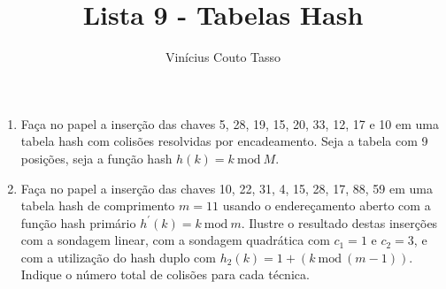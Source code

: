 \documentclass{article}
\title{Lista 9 - Tabelas Hash
}
\author{Vinícius Couto Tasso}
\date{}
\begin{document}
\maketitle
         
\begin{enumerate}

\item Faça no papel a inserção das chaves 5, 28, 19, 15, 20, 33, 12, 17 e 10 em uma tabela hash com colisões resolvidas por encadeamento. Seja a tabela com 9 posições,  seja a função hash $h(k) = k\ \text{mod}\ M$.



\item Faça no papel a inserção das chaves 10, 22, 31, 4, 15, 28, 17, 88, 59 em uma tabela hash de comprimento $m = 11$ usando o endereçamento aberto com a função hash primário $h^\prime(k)=k\ \text{mod}\ m$. Ilustre o resultado destas inserções com a sondagem linear, com a sondagem quadrática com $c_1 = 1$ e $c_2 = 3$, e com a utilização do hash duplo com $h_2(k) = 1 + (k\ \text{mod}\ (m - 1))$. Indique o número total de colisões para cada técnica.







\end{enumerate}
\end{document}
